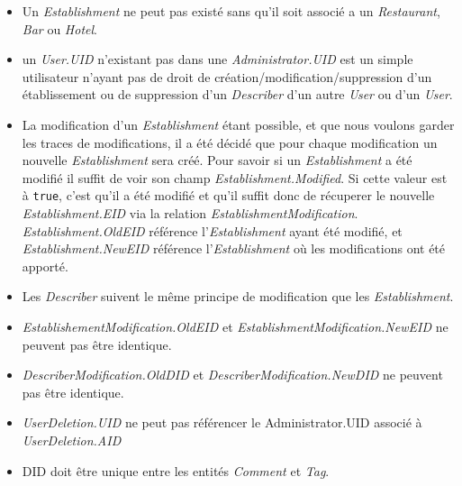 \documentclass{article}
\begin{document}
\begin{itemize}
    \item Un \textsl{Establishment} ne peut pas existé sans qu'il soit associé a un \textsl{Restaurant}, \textsl{Bar} ou \textsl{Hotel}.
    
    \item un \textsl{User.UID} n'existant pas dans une \textsl{Administrator.UID} est un simple utilisateur n'ayant pas de droit de création/modification/suppression d'un établissement ou de suppression d'un \textsl{Describer} d'un autre \textsl{User} ou d'un \textsl{User}.
    
    \item La modification d'un \textsl{Establishment} étant possible, et que nous voulons garder les traces de modifications, il a été décidé que pour chaque modification un nouvelle \textsl{Establishment} sera créé. Pour savoir si un \textsl{Establishment} a été modifié il suffit de voir son champ \textsl{Establishment.Modified}. Si cette valeur est à \texttt{true}, c'est qu'il a été modifié et qu'il suffit donc de récuperer le nouvelle \textsl{Establishment.EID} via la relation \textsl{EstablishmentModification}. \textsl{Establishment.OldEID} référence l'\textsl{Establishment} ayant été modifié, et \textsl{Establishment.NewEID} référence l'\textsl{Establishment} où les modifications ont été apporté.

    \item Les \textsl{Describer} suivent le même principe de modification que les \textsl{Establishment}.

    \item \textsl{EstablishementModification.OldEID} et \textsl{EstablishmentModification.NewEID} ne peuvent pas être identique.
    
    \item \textsl{DescriberModification.OldDID} et \textsl{DescriberModification.NewDID} ne peuvent pas être identique.

    \item \textsl{UserDeletion.UID} ne peut pas référencer le {Administrator.UID} associé à \textsl{UserDeletion.AID}

    \item DID doit être unique entre les entités \textsl{Comment} et \textsl{Tag}.

\end{itemize}
\end{document}
